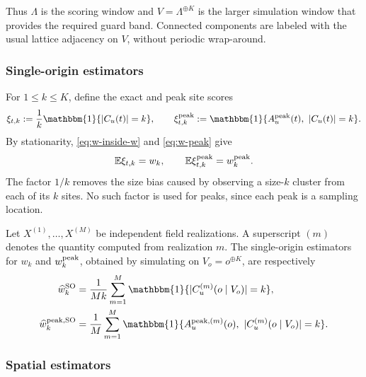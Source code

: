 \documentclass[aap,preprint]{imsart}
\theoremstyle{plain}
\theoremstyle{definition}
\def\E{{\mathbb E}}
\begin{document}
Thus $\Lambda$ is the scoring window and $V=\Lambda^{\oplus K}$ is the larger simulation window that provides the required guard band. Connected components are labeled with the usual lattice adjacency on $V$, without periodic wrap-around.

\subsubsection{Single-origin estimators}
\label{sec:mc-estimators}

For $1\leq k\leq K$, define the exact and peak site scores
\begin{equation}\label{eq:xi}
	\xi_{t,k}
	:=\frac1k\mathbbm{1}\{|C_u(t)|=k\},
	\qquad
	\xi_{t,k}^{\rm peak}
	:=\mathbbm{1}\{A_u^{\rm peak}(t),\ |C_u(t)|=k\}.
\end{equation}
By stationarity, \eqref{eq:w-inside-w} and \eqref{eq:w-peak} give
\begin{equation*}
	\E\xi_{t,k}=w_k,
	\qquad
	\E\xi_{t,k}^{\rm peak}=w_k^{\rm peak}.
\end{equation*}
The factor $1/k$ removes the size bias caused by observing a size-$k$
cluster from each of its $k$ sites.  No such factor is used for peaks, since
each peak is a sampling location.

Let $X^{(1)},\ldots,X^{(M)}$ be independent field realizations. A superscript $(m)$ denotes the quantity computed
from realization $m$. The single-origin estimators for $w_k$ and $w_k^{\rm peak}$, obtained by simulating on $V_o=o^{\oplus K}$, are respectively
\begin{equation*}
	\begin{aligned}
		\widehat w_k^{\rm SO}
		&=\frac1{Mk}\sum_{m=1}^M
		\mathbbm{1}\{|C_u^{(m)}(o\mid V_o)|=k\},\\
		\widehat w_k^{{\rm peak},{\rm SO}}
		&=\frac1M\sum_{m=1}^M
		\mathbbm{1}\{A_u^{{\rm peak},(m)}(o),\
		|C_u^{(m)}(o\mid V_o)|=k\}.
	\end{aligned}
\end{equation*}


\subsubsection{Spatial estimators}
\end{document}
